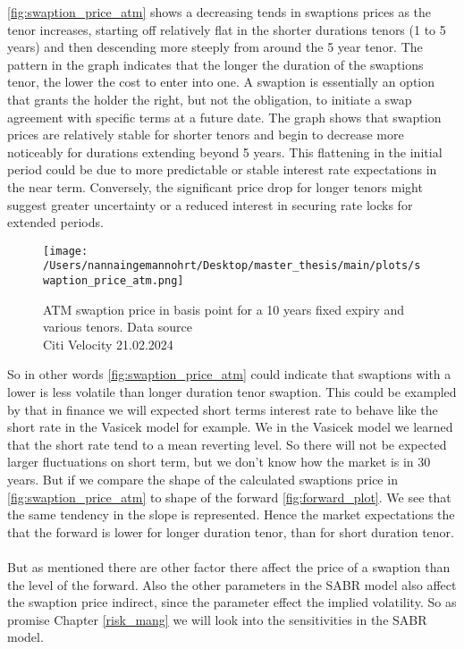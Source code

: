 \noindent
\autoref{fig:swaption_price_atm} shows a decreasing tends in swaptions prices as the tenor increases,
starting off relatively flat in the shorter durations tenors (1 to 5 years) and then 
descending more steeply from around the 5 year tenor. 
The pattern in the graph indicates that the longer the duration of the swaptions tenor, 
the lower the cost to enter into one. A swaption is essentially an option that grants the 
holder the right, but not the obligation, to initiate a swap agreement with specific terms at a future date. 
The graph shows that swaption prices are relatively stable for shorter tenors and begin to 
decrease more noticeably for durations extending beyond 5 years. 
This flattening in the initial period could be due to more predictable or stable interest 
rate expectations in the near term. Conversely, the significant price drop for longer 
tenors might suggest greater uncertainty or a reduced interest in securing rate locks for extended periods.
\begin{figure}[H]
    \centering
    \texttt{[image: /Users/nannaingemannohrt/Desktop/master\_thesis/main/plots/swaption\_price\_atm.png]}
    \caption{ATM swaption price in basis point for a 10 years fixed expiry and various tenors.
    Data source  \\ Citi Velocity 21.02.2024}
    \label{fig:swaption_price_atm}
\end{figure}
\noindent
So in other words \autoref{fig:swaption_price_atm}  could indicate that swaptions with a lower is less
volatile than longer duration tenor swaption. This could be exampled by that in finance we will 
expected short terms interest rate to behave like the short rate in the Vasicek model for example. 
We in the Vasicek model we learned that the short rate tend to a mean reverting level. 
So there will not be expected larger fluctuations on short term, but we don't know how the market is in 
30 years. But if we compare the shape of the calculated swaptions price in \autoref{fig:swaption_price_atm} 
to shape of the forward \autoref{fig:forward_plot}. We see that the same tendency in the slope 
is represented. Hence the market expectations the that the forward is lower for longer duration tenor, 
than for short duration tenor. 
\\\\
But as mentioned there are other factor there affect the price of a swaption than the level of the forward. 
Also the other parameters in the SABR model also affect the swaption price indirect, 
since the parameter effect the implied volatility. 
So as promise Chapter \ref{risk_mang} we will look into the sensitivities in the SABR model.
